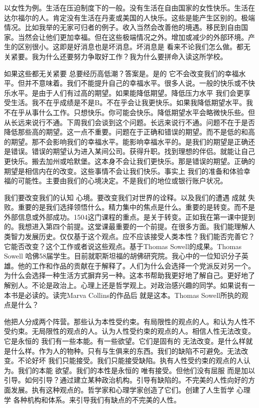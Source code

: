 以女性为例。生活在压迫制度下的一般。没有生活在自由国家的女性快乐。生活在达尔福尔的人。肯定没有生活在丹麦或美国的人快乐。这些是能产生区别的。极端情况。比如我举的无家可归者的例子。收入当然会改善他的境遇。移民到自由国家。当然会让他们更加幸福。但在这些极端情况之外。增加或减少的外部环境。产生的区别很小。这即是好消息也是坏消息。坏消息是 看来不论我们怎么做。都无关紧要。我为什么还要努力争取好工作？我为什么要拼命入读这所学校。 

如果这些都无关紧要 总要经历高低潮？答案是。是的 它不会改变我们的幸福水平。但并不意味着。我们不能提升自己的幸福水平。很多人说。一般的快乐或不快乐水平。是由于人们有过高的期望。如果能降低期望。降低压力水平 我们会更享受生活。我不在乎成绩是不是B。不在乎会让我更快乐。如果我降低期望水平。我不在乎从事什么工作。只想快乐。你可能会快乐。降低期望水平会略微快乐些。但从长远来说行不通。下周我们会谈到这个问题。长远来说行不通。问题不在于是否降低那些高的期望。这一点不重要。问题在于正确和错误的期望。而不是低的和高的期望。那不会影响我们的幸福水平。能影响幸福水平的。是我们的期望是正确还是错误。错误的期望认为进入某间公司。获得升职。找到理想的伴侣。就能让自己更快乐。搬去加州或哈默堡。这本身不会让我们更快乐。那是错误的期望。正确的期望是相信内在的改变。这些事情不会让我们快乐。事实上 我们的准备和体验幸福的可能性。主要由我们的心境决定。不是我们的地位或银行账户状况。 

我们要改变我们的认知 心境。要改变我们对世界的诠释。以及我们的遭遇 成就 失败。重要的是我们选择领悟什么。精力集中的焦点是什么。重要的是转变。而不是外部信息或外部成功。1504这门课程的重点。是关于转变。正如我在第一课中提到的。我想进入第四个前提。这堂课最重要的一个前提。在很多方面。我们能理解人类智力发展历史。仅仅基于这个观点。应不应该接受人类本性？我们能否完善它？它能否改变？这个工作或者说这些观点。基于Thomas Sowell的成果。Thomas Sowell 哈佛58届学生。目前就职斯坦福的胡佛研究院。我心中的一位知识分子英雄。他的工作和作品的贡献在于解释了。人们为什么会选择一个党派反对另一个。为什么会选择一种生活方式摒弃另一种。这本书帮助我更好地了解自己。更好地了解别人。不论是政治上。心理上还是哲学观上。对政治感兴趣的同学。如果说有一本书是必读的。读完Marva Collins的作品后 就是这本。Thomas Sowell所执的观点是什么？ 

他把人分成两个阵营。那些认为本性受约束。有局限性的观点的人。和认为人性不受约束。无局限性的观点的人。认为人性受约束的观点的人。相信人性无法改变。它是永恒的 我们有一些本能。有一些欲望。它们是固有的 无法改变。是什么样就是什么样。作为人的物种。只有与生俱来的东西。我们的缺陷不可避免。无法改变。不论好坏 我们只能接受。我们只能接受缺陷。执有人性受约束的观点的人认为。我们的本能 欲望。我们的本性是永恒的 唯有接受。但他们没有屈服 而是加以引导。如何引导？通过建立某种政治机构。引导有缺陷的。不完美的人性向好的方面发展。执有这种观点的。哲学家和心理学家创造了它们。创建了人生哲学 心理学 各种机构和体系。来引导我们有缺点的不完美的人性。 

